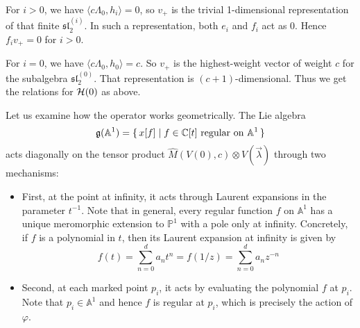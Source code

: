 \documentclass[12pt]{article}
\begin{document}
\begin{remark}
    For $i>0$, we have $\langle c\Lambda_0, h_i\rangle = 0$, so $v_+$ is the trivial 1-dimensional representation of that finite $\mathfrak{sl}_2^{(i)}$. In such a representation, both $e_i$ and $f_i$ act as 0. Hence $f_i v_+ = 0$ for $i>0$.

    For $i=0$, we have $\langle c\Lambda_0, h_0\rangle = c$. So $v_+$ is the highest-weight vector of weight $c$ for the subalgebra $\mathfrak{sl}_2^{(0)}$. That representation is $(c+1)$-dimensional. Thus we get the relations for ${\mathcal{H}}(0)$ as above.
\end{remark}

\begin{remark}
     Let us examine how the operator works geometrically. The Lie algebra
    \[
        \mathfrak g(\mathbb A^1) = \{\,x[f]\mid f\in\mathbb{C}[t]\text{ regular on }\mathbb A^1\,\}
    \]
    acts diagonally on the tensor product $\widehat M(V(0),c)\otimes V(\vec\lambda)$ through two mechanisms:

    \begin{itemize}
        \item First, at the point at infinity, it acts through Laurent expansions in the parameter $t^{-1}$. Note that in general, every regular function $f$ on $\mathbb A^1$ has a unique meromorphic extension to $\mathbb P^1$ with a pole only at infinity. Concretely, if $f$ is a polynomial in $t$, then its Laurent expansion at infinity is given by
              \[f(t) = \sum_{n=0}^d a_n t^n = f(1/z) = \sum_{n=0}^d a_n z^{-n}\]
        \item Second, at each marked point $p_i$, it acts by evaluating the polynomial $f$ at $p_i$. Note that $p_i \in \mathbb A^1$ and hence $f$ is regular at $p_i$, which is precisely the action of $\varphi$.
    \end{itemize}
\end{remark}
\end{document}
